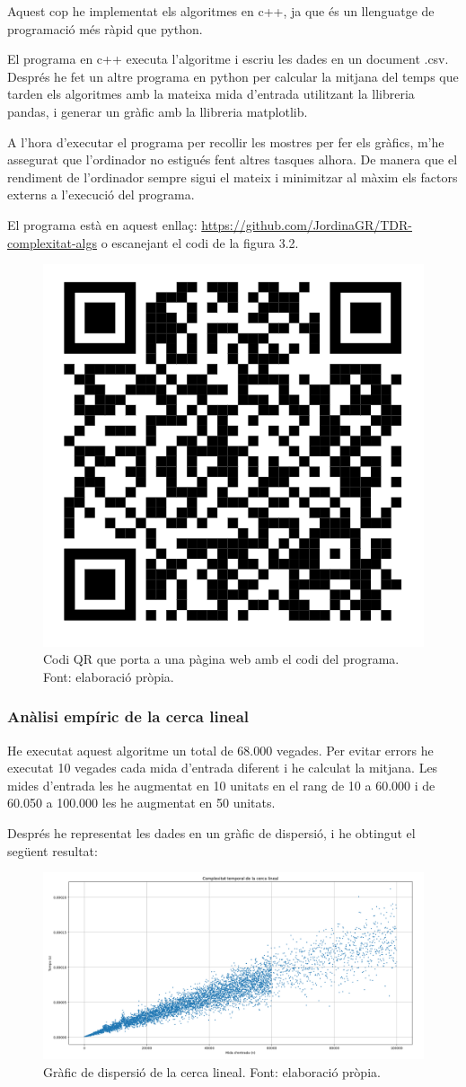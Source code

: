 Aquest cop he implementat els algoritmes en c++, ja que és un llenguatge de programació més ràpid que python. 

El programa en c++ executa l'algoritme i escriu les dades en un document .csv. Després he fet un altre programa en python per calcular la mitjana del temps que tarden els algoritmes amb la mateixa mida d'entrada utilitzant la llibreria pandas, i generar un gràfic amb la llibreria matplotlib.

A l'hora d'executar el programa per recollir les mostres per fer els gràfics, m'he assegurat que l'ordinador no estigués fent altres tasques alhora. De manera que el rendiment de l'ordinador sempre sigui el mateix i minimitzar al màxim els factors externs a l'execució del programa.

El programa està en aquest enllaç: \url{https://github.com/JordinaGR/TDR-complexitat-algs} o escanejant el codi de la figura 3.2.

\begin{figure}[H]
    \centering
    \includegraphics[width=.15\textwidth]{capitols/figures/qralgs_complex.png}
    \caption[Codi QR que porta a una pàgina web amb el codi del programa]{Codi QR que porta a una pàgina web amb el codi del programa. Font: elaboració pròpia.}
    \label{fig:my_label}
\end{figure}

\subsubsection{Anàlisi empíric de la cerca lineal}
He executat aquest algoritme un total de 68.000 vegades. Per evitar errors he executat 10 vegades cada mida d'entrada diferent i he calculat la mitjana. Les mides d'entrada les he augmentat en 10 unitats en el rang de 10 a 60.000 i de 60.050 a 100.000 les he augmentat en 50 unitats.

Després he representat les dades en un gràfic de dispersió, i he obtingut el següent resultat:
\begin{figure}[H]
    \centering
    \includegraphics[width=1\textwidth]{capitols/figures/linearplot3.png}
    \caption[Gràfic de dispersió de la cerca lineal.]{Gràfic de dispersió de la cerca lineal. Font: elaboració pròpia.}
    \label{fig:my_label}
\end{figure}

